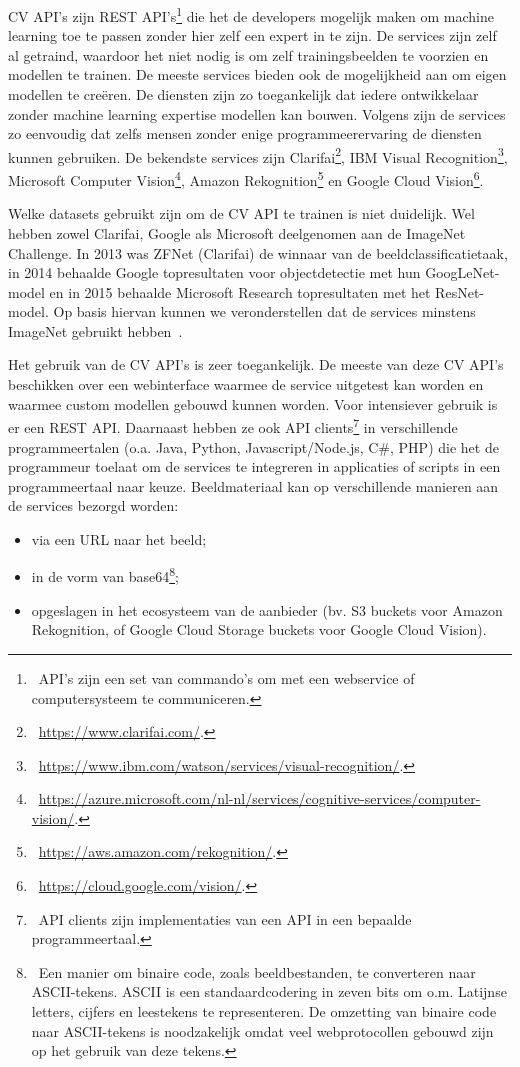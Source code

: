CV API’s zijn REST API’s\footnote{~API's zijn een set van commando's om met een webservice of computersysteem te communiceren.} die het de developers mogelijk maken om machine learning toe te passen zonder hier zelf een expert in te zijn.  De services zijn zelf al getraind, waardoor het niet nodig is om zelf trainingsbeelden te voorzien en modellen te trainen. De meeste services bieden ook de mogelijkheid aan om eigen modellen te cre\"{e}ren. De diensten zijn zo toegankelijk dat iedere ontwikkelaar zonder machine learning expertise modellen kan bouwen. Volgens \textcite{Lardinois2018} zijn de services zo eenvoudig dat zelfs mensen zonder enige programmeerervaring de diensten kunnen gebruiken. De bekendste services zijn Clarifai\footnote{~\url{https://www.clarifai.com/}.}, IBM Visual Recognition\footnote{~\url{https://www.ibm.com/watson/services/visual-recognition/}.}, Microsoft Computer Vision\footnote{~\url{https://azure.microsoft.com/nl-nl/services/cognitive-services/computer-vision/}.}, Amazon Rekognition\footnote{~\url{https://aws.amazon.com/rekognition/}.} en Google Cloud Vision\footnote{~\url{https://cloud.google.com/vision/}.}. 

Welke datasets gebruikt zijn om de CV API te trainen is niet duidelijk. Wel hebben zowel Clarifai, Google als Microsoft deelgenomen aan de ImageNet Challenge. In 2013 was ZFNet (Clarifai) de winnaar van de beeldclassificatietaak, in 2014 behaalde Google topresultaten voor objectdetectie met hun GoogLeNet-model en in 2015 behaalde Microsoft Research topresultaten met het ResNet-model. Op basis hiervan kunnen we veronderstellen dat de services minstens ImageNet gebruikt hebben~\autocite{Brownlee2019a}.

Het gebruik van de CV API’s is zeer toegankelijk. De meeste van deze CV API’s beschikken over een webinterface waarmee de service uitgetest kan worden en waarmee custom modellen gebouwd kunnen worden. Voor intensiever gebruik is er een REST API. Daarnaast hebben ze ook API clients\footnote{~API clients zijn implementaties van een API in een bepaalde programmeertaal.} in verschillende programmeertalen (o.a. Java, Python, Javascript/Node.js, C\#, PHP) die het de programmeur toelaat om de services te integreren in applicaties of scripts in een programmeertaal naar keuze. Beeldmateriaal kan op verschillende manieren aan de services bezorgd worden:
\begin{itemize}
	\item via een URL naar het beeld;
	\item in de vorm van base64\footnote{~Een manier om binaire code, zoals beeldbestanden, te converteren naar ASCII-tekens. ASCII is een standaardcodering in zeven bits om o.m. Latijnse letters, cijfers en leestekens te representeren. De omzetting van binaire code naar ASCII-tekens is noodzakelijk omdat veel webprotocollen gebouwd zijn op het gebruik van deze tekens.};
	\item opgeslagen in het ecosysteem van de aanbieder (bv. S3 buckets voor Amazon Rekognition, of Google Cloud Storage buckets voor Google Cloud Vision).
\end{itemize}

